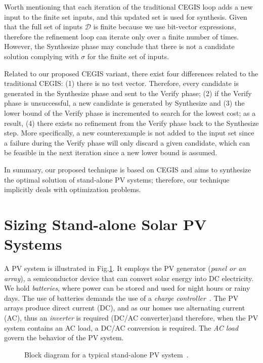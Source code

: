 \documentclass[journal]{IEEEtran}
\begin{document}
Worth mentioning that each iteration of the traditional CEGIS loop adds a new input to the finite set {\sc inputs}, and this updated set is used for synthesis. Given that the full set of inputs $\mathcal{D}$ is finite because we use bit-vector expressions, therefore the refinement loop can iterate only over a finite number of times. However, the {\sc Synthesize} phase may conclude that there is not a candidate solution complying with $\sigma$ for the finite set of {\sc inputs}.

Related to our proposed CEGIS variant, there exist four differences related to the traditional CEGIS:
(1) there is no test vector. Therefore, every candidate is generated in the {\sc Synthesize} phase and sent to the {\sc Verify} phase; 
(2) if the {\sc Verify} phase is unsuccessful, a new candidate is generated by {\sc Synthesize} and 
(3) the lower bound of the {\sc Verify} phase is incremented to search for the lowest cost; as a result,
(4) there exists no refinement from the {\sc Verify} phase back to the {\sc Synthesize} step. More specifically, a new counterexample is not added to the {\sc input} set since a failure during the {\sc Verify} phase will only discard a given candidate, which can be feasible in the next iteration since a new lower bound is assumed.

In summary, our proposed technique is based on CEGIS and aims to synthesize the optimal solution of stand-alone PV systems; therefore, our technique implicitly deals with optimization problems.

\section{Sizing Stand-alone Solar PV Systems}
\label{sec:sizing}
A PV system is illustrated in Fig.\ref{fig:blockdiagram}. It employs the PV generator (\textit{panel or an array}), a semiconductor device that can convert solar energy into DC electricity. We hold \textit{batteries}, where power can be stored and used for night hours or rainy days. The use of batteries demands the use of a \textit{charge controller}~\cite{Hansen}. The PV arrays produce direct current (DC), and as our homes use alternating current (AC), thus an \textit{inverter} is required (DC/AC converter)and therefore, when the PV system contains an AC load, a DC/AC conversion is required. The \textit{AC load} govern the behavior of the PV system.
%
\begin{figure}[ht]
\centering
\caption{Block diagram for a typical stand-alone PV system~\cite{Hansen}.}
\label{fig:blockdiagram} 
\end{figure}
 
\end{document}
